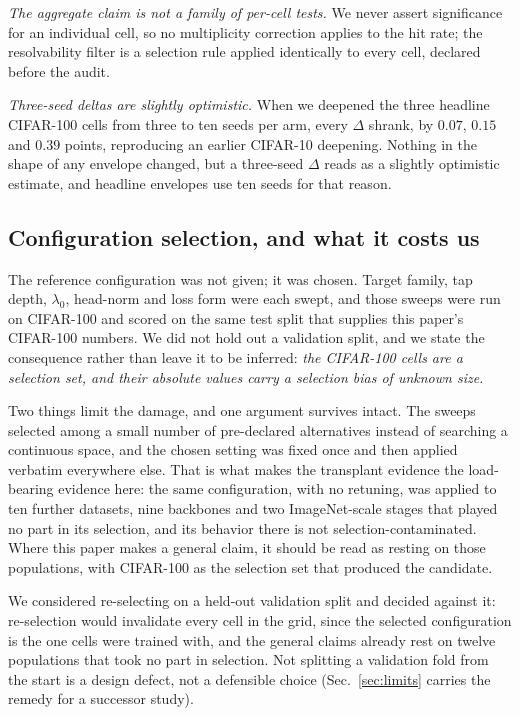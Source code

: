 \emph{The aggregate claim is not a family of per-cell tests.} We never assert
significance for an individual cell, so no multiplicity correction applies to
the hit rate; the resolvability filter is a selection rule applied identically
to every cell, declared before the audit.

\emph{Three-seed deltas are slightly optimistic.} When we deepened the three
headline CIFAR-100 cells from three to ten seeds per arm, every $\Delta$
shrank, by $0.07$, $0.15$ and $0.39$ points, reproducing an earlier CIFAR-10
deepening. Nothing in the shape of any envelope changed, but a three-seed
$\Delta$ reads as a slightly optimistic estimate, and headline envelopes use
ten seeds for that reason.

\subsection{Configuration selection, and what it costs us}\label{sec:selection}
The reference configuration was not given; it was chosen. Target family, tap
depth, $\lambda_0$, head-norm and loss form were each swept, and those sweeps
were run on CIFAR-100 and scored on the same test split that supplies this
paper's CIFAR-100 numbers. We did not hold out a validation split, and we state
the consequence rather than leave it to be inferred: \emph{the CIFAR-100 cells
are a selection set, and their absolute values carry a selection bias of
unknown size.}

Two things limit the damage, and one argument survives intact. The sweeps
selected among a small number of pre-declared alternatives instead of
searching a continuous space, and the chosen setting was fixed once and then
applied verbatim everywhere else. That is what makes the transplant evidence
the load-bearing evidence here: the same configuration, with no retuning, was
applied to ten further datasets, nine backbones and two ImageNet-scale stages
that played no part in its selection, and its behavior there is not
selection-contaminated. Where this paper makes a general claim, it should be
read as resting on those populations, with CIFAR-100 as the selection set
that produced the candidate.

We considered re-selecting on a held-out validation split
and decided against it: re-selection would invalidate every cell in the grid,
since the selected configuration is the one \computeCells{} cells were
trained with, and the general claims already rest on twelve populations that
took no part in selection. Not splitting a validation fold from the start is
a design defect, not a defensible choice
(Sec.~\ref{sec:limits} carries the remedy for a successor study).

